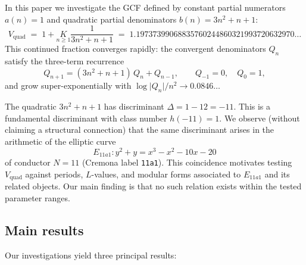\documentclass[11pt,a4paper]{article}
\theoremstyle{definition}
\theoremstyle{remark}
\newcommand{\Vq}{V_{\mathrm{quad}}}
\newcommand{\abs}[1]{\lvert #1 \rvert}
\begin{document}
In this paper we investigate the GCF defined by constant partial
numerators $a(n) = 1$ and quadratic partial denominators
$b(n) = 3n^2 + n + 1$:
\begin{equation}\label{eq:vquad-def}
  \Vq \;=\; 1 + \underset{n \ge 1}{K} \frac{1}{3n^2 + n + 1}
  \;=\; 1.19737399068835760244860321993720632970\ldots
\end{equation}
This continued fraction converges rapidly: the convergent denominators
$Q_n$ satisfy the three-term recurrence
\begin{equation}\label{eq:recurrence}
  Q_{n+1} = (3n^2 + n + 1) \, Q_n + Q_{n-1},
  \qquad Q_{-1} = 0, \quad Q_0 = 1,
\end{equation}
and grow super-exponentially with $\log \abs{Q_n} / n^2 \to 0.0846\ldots$

The quadratic $3n^2 + n + 1$ has discriminant $\Delta = 1 - 12 = -11$.
This is a fundamental discriminant with class number $h(-11) = 1$.
We observe (without claiming a structural connection) that the
same discriminant arises in the arithmetic of the elliptic curve
\begin{equation}\label{eq:11a1}
  E_{11a1}\colon y^2 + y = x^3 - x^2 - 10x - 20
\end{equation}
of conductor $N = 11$ (Cremona label \texttt{11a1}).  This coincidence
motivates testing $\Vq$ against periods, $L$-values, and modular forms
associated to $E_{11a1}$ and its related objects.
Our main finding is that no such relation exists within the tested
parameter ranges.

\subsection{Main results}

Our investigations yield three principal results:
\end{document}
